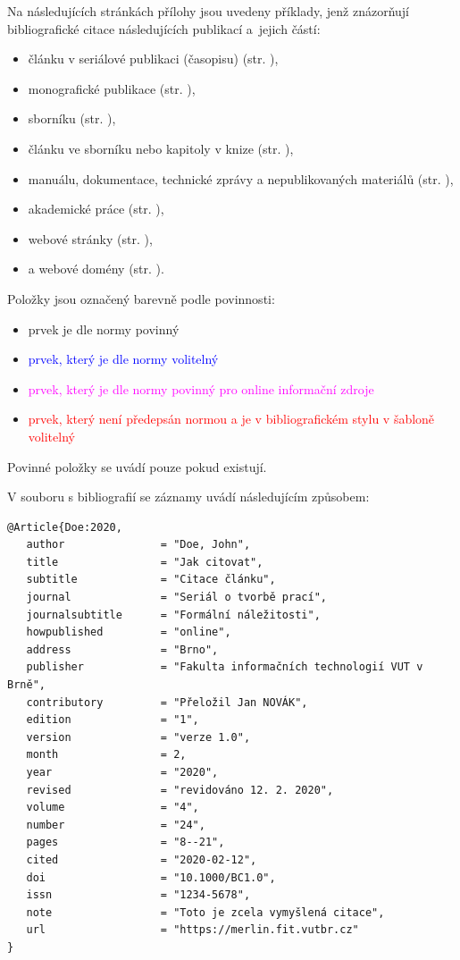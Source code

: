 Na následujících stránkách přílohy jsou uvedeny příklady, jenž znázorňují bibliografické citace následujících publikací a~jejich částí:
\begin{itemize}
   \item článku v seriálové publikaci (časopisu) (str. \pageref{pr-casopis-clanek}),
   \item monografické publikace (str. \pageref{pr-monografie}),
   \item sborníku (str. \pageref{pr-sbornik}),
   \item článku ve sborníku nebo kapitoly v knize (str. \pageref{pr-kapitola}),
   \item manuálu, dokumentace, technické zprávy a nepublikovaných materiálů (str. \pageref{pr-manual}),
   \item akademické práce (str. \pageref{pr-thesis}),
   \item webové stránky (str. \pageref{pr-webpage}),
   \item a webové domény (str. \pageref{pr-website}).
\end{itemize}

\noindent Položky jsou označený barevně podle povinnosti:
\begin{itemize}
    \item prvek je dle normy povinný
    \item \textcolor{blue}{prvek, který je dle normy volitelný}
    \item \textcolor{magenta}{prvek, který je dle normy povinný pro online informační zdroje}
    \item \textcolor{red}{prvek, který není předepsán normou a je v bibliografickém stylu v šabloně volitelný}
\end{itemize}
Povinné položky se uvádí pouze pokud existují.

\newpage
\noindent V souboru s bibliografií se záznamy uvádí následujícím způsobem:
\begin{verbatim}
@Article{Doe:2020,
   author               = "Doe, John",
   title                = "Jak citovat",
   subtitle             = "Citace článku",
   journal              = "Seriál o tvorbě prací",
   journalsubtitle      = "Formální náležitosti",
   howpublished         = "online",
   address              = "Brno",
   publisher            = "Fakulta informačních technologií VUT v Brně",
   contributory         = "Přeložil Jan NOVÁK",
   edition              = "1",
   version              = "verze 1.0",
   month                = 2,
   year                 = "2020",
   revised              = "revidováno 12. 2. 2020",
   volume               = "4",
   number               = "24",
   pages                = "8--21",
   cited                = "2020-02-12",
   doi                  = "10.1000/BC1.0",
   issn                 = "1234-5678",
   note                 = "Toto je zcela vymyšlená citace",
   url                  = "https://merlin.fit.vutbr.cz"
}
\end{verbatim}

